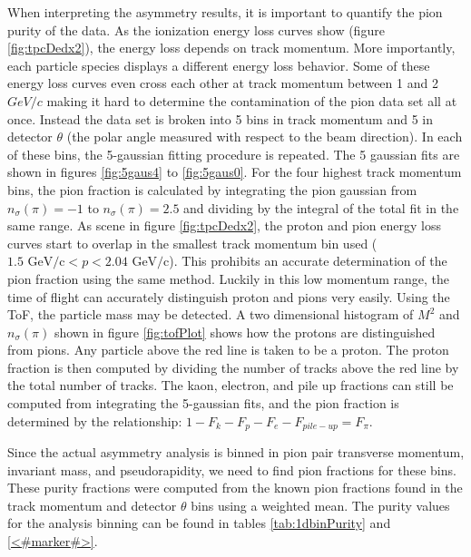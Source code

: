 \documentclass[abstract = on,listof=totoc, bibliography=totoc]{scrreprt}
\begin{document}
When interpreting the asymmetry results, it is important to quantify the pion purity of the data. As the ionization energy loss curves show (figure \ref{fig:tpcDedx2}), the energy loss depends on track momentum. More importantly, each particle species displays a different energy loss behavior. Some of these energy loss curves even cross each other at track momentum between 1 and 2 $GeV/c$ making it hard to determine the contamination of the pion data set all at once. Instead the data set is broken into 5 bins in track momentum and 5 in detector $\theta$ (the polar angle measured with respect to the beam direction). In each of these bins, the 5-gaussian fitting procedure is repeated. The 5 gaussian fits are shown in figures \ref{fig:5gaus4} to \ref{fig:5gaus0}. For the four highest track momentum bins, the pion fraction is calculated by integrating the pion gaussian from $n_\sigma(\pi) = -1$ to $n_\sigma(\pi) = 2.5$ and dividing by the integral of the total fit in the same range. As scene in figure \ref{fig:tpcDedx2}, the proton and pion energy loss curves start to overlap in the smallest track momentum bin used ($1.5 \text{ GeV/c} < p < 2.04 \text{ GeV/c}$). This prohibits an accurate determination of the pion fraction using the same method. Luckily in this low momentum range, the time of flight can accurately distinguish proton and pions very easily. Using the ToF, the particle mass may be detected. A two dimensional histogram of $M^2$ and $n_\sigma(\pi)$ shown in figure \ref{fig:tofPlot} shows how the protons are distinguished from pions. Any particle above the red line is taken to be a proton. The proton fraction is then computed by dividing the number of tracks above the red line by the total number of tracks. The kaon, electron, and pile up fractions can still be computed from integrating the 5-gaussian fits, and the pion fraction is determined by the relationship: $1-F_k - F_p - F_e - F_{pile-up} = F_\pi$. 

Since the actual asymmetry analysis is binned in pion pair transverse momentum, invariant mass, and pseudorapidity, we need to find pion fractions for these bins. These purity fractions were computed from the known pion fractions found in the track momentum and detector $\theta$ bins using a weighted mean. The purity values for the analysis binning can be found in tables \ref{tab:1dbinPurity} and \ref{<#marker#>}.
\end{document}
